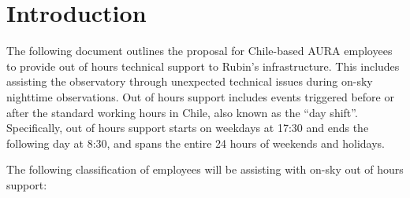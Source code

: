 \section{Introduction}

The following document outlines the proposal for Chile-based AURA employees to provide out of hours technical support to Rubin's infrastructure.
This includes assisting the observatory through unexpected technical issues during on-sky nighttime observations.
Out of hours support includes events triggered before or after the standard working hours in Chile, also known as the ``day shift''.
Specifically, out of hours support starts on weekdays at 17:30 and ends the following day at 8:30, and spans the entire 24 hours of weekends and holidays.


The following classification of employees will be assisting with on-sky out of hours support:

